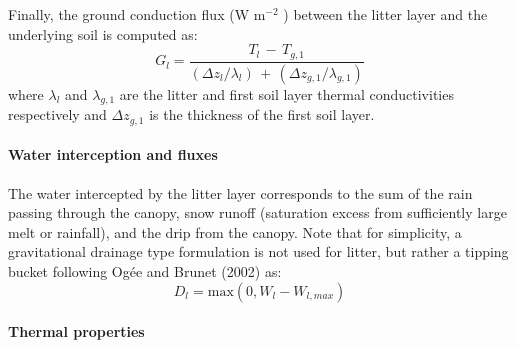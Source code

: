 {Finally, the ground conduction flux (W m$^{-2}$ ) between the litter layer
and the underlying soil is computed as:
%
\begin{equation}
 G_{l} =  \frac{T_l \,-\, T_{g,1}}
{ \left({\Delta z_l}   /{\lambda_l}   \right) \,+\, 
  \left({\Delta z_{g,1}}/{\lambda_{g,1}}\right) }
\end{equation}
%
where $\lambda_l$ and $\lambda_{g,1}$ are the litter and first soil
layer thermal conductivities respectively and $\Delta z_{g,1}$ is the
thickness of the first soil layer.


\paragraph{Water interception and fluxes}

The water intercepted by the litter layer corresponds to the sum of the
rain passing through the canopy, snow runoff (saturation excess from
sufficiently large melt or rainfall), and the drip from the canopy.
%
%
%
%
%
Note that for simplicity, a gravitational drainage type formulation is
not used for litter, but rather a tipping bucket following
Og\'ee and Brunet (2002)\nocite{ogee2002forest} as:
%
\begin{equation}
 D_l= \mathrm{max}\left(0,W_{l}-W_{l,max}\right)
\end{equation}
%


\paragraph{Thermal properties}

}
